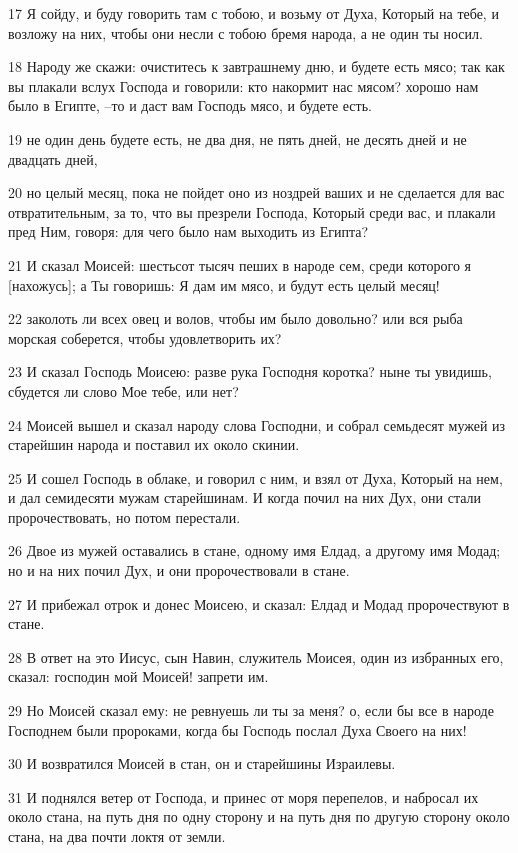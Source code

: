 \par 17 Я сойду, и буду говорить там с тобою, и возьму от Духа, Который на тебе, и возложу на них, чтобы они несли с тобою бремя народа, а не один ты носил.
\par 18 Народу же скажи: очиститесь к завтрашнему дню, и будете есть мясо; так как вы плакали вслух Господа и говорили: кто накормит нас мясом? хорошо нам было в Египте, --то и даст вам Господь мясо, и будете есть.
\par 19 не один день будете есть, не два дня, не пять дней, не десять дней и не двадцать дней,
\par 20 но целый месяц, пока не пойдет оно из ноздрей ваших и не сделается для вас отвратительным, за то, что вы презрели Господа, Который среди вас, и плакали пред Ним, говоря: для чего было нам выходить из Египта?
\par 21 И сказал Моисей: шестьсот тысяч пеших в народе сем, среди которого я [нахожусь]; а Ты говоришь: Я дам им мясо, и будут есть целый месяц!
\par 22 заколоть ли всех овец и волов, чтобы им было довольно? или вся рыба морская соберется, чтобы удовлетворить их?
\par 23 И сказал Господь Моисею: разве рука Господня коротка? ныне ты увидишь, сбудется ли слово Мое тебе, или нет?
\par 24 Моисей вышел и сказал народу слова Господни, и собрал семьдесят мужей из старейшин народа и поставил их около скинии.
\par 25 И сошел Господь в облаке, и говорил с ним, и взял от Духа, Который на нем, и дал семидесяти мужам старейшинам. И когда почил на них Дух, они стали пророчествовать, но потом перестали.
\par 26 Двое из мужей оставались в стане, одному имя Елдад, а другому имя Модад; но и на них почил Дух, и они пророчествовали в стане.
\par 27 И прибежал отрок и донес Моисею, и сказал: Елдад и Модад пророчествуют в стане.
\par 28 В ответ на это Иисус, сын Навин, служитель Моисея, один из избранных его, сказал: господин мой Моисей! запрети им.
\par 29 Но Моисей сказал ему: не ревнуешь ли ты за меня? о, если бы все в народе Господнем были пророками, когда бы Господь послал Духа Своего на них!
\par 30 И возвратился Моисей в стан, он и старейшины Израилевы.
\par 31 И поднялся ветер от Господа, и принес от моря перепелов, и набросал их около стана, на путь дня по одну сторону и на путь дня по другую сторону около стана, на два почти локтя от земли.
